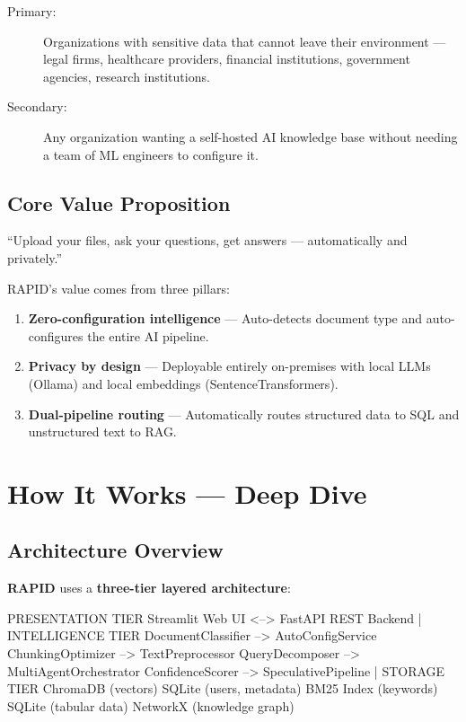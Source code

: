 \documentclass[12pt, a4paper, oneside]{report}
\newcommand{\rapidsys}{\textbf{\color{rapidblue}RAPID}}
\begin{document}
\begin{description}
  \item[Primary:] Organizations with sensitive data that cannot leave their environment —
        legal firms, healthcare providers, financial institutions, government agencies,
        research institutions.
  \item[Secondary:] Any organization wanting a self-hosted AI knowledge base without needing
        a team of ML engineers to configure it.
\end{description}

\section{Core Value Proposition}

\begin{infobox}
``Upload your files, ask your questions, get answers — automatically and privately.''
\end{infobox}

RAPID's value comes from three pillars:
\begin{enumerate}
  \item \textbf{Zero-configuration intelligence} — Auto-detects document type and auto-configures
        the entire AI pipeline.
  \item \textbf{Privacy by design} — Deployable entirely on-premises with local LLMs (Ollama)
        and local embeddings (SentenceTransformers).
  \item \textbf{Dual-pipeline routing} — Automatically routes structured data to SQL and
        unstructured text to RAG.
\end{enumerate}

\chapter{How It Works — Deep Dive}

\section{Architecture Overview}

\rapidsys{} uses a \textbf{three-tier layered architecture}:

\begin{codebox}
PRESENTATION TIER
  Streamlit Web UI  <-->  FastAPI REST Backend
              |
INTELLIGENCE TIER
  DocumentClassifier --> AutoConfigService
  ChunkingOptimizer  --> TextPreprocessor
  QueryDecomposer    --> MultiAgentOrchestrator
  ConfidenceScorer   --> SpeculativePipeline
              |
STORAGE TIER
  ChromaDB (vectors)    SQLite (users, metadata)
  BM25 Index (keywords) SQLite (tabular data)
  NetworkX (knowledge graph)
\end{codebox}
\end{document}
